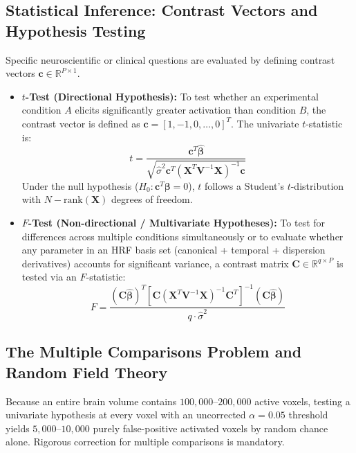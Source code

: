 \documentclass[11pt,a4paper]{article}
\begin{document}
\subsection{Statistical Inference: Contrast Vectors and Hypothesis Testing}
Specific neuroscientific or clinical questions are evaluated by defining contrast vectors $\mathbf{c} \in \mathbb{R}^{P \times 1}$. 
\begin{itemize}[leftmargin=2em]
    \item \textbf{$t$-Test (Directional Hypothesis):} To test whether an experimental condition $A$ elicits significantly greater activation than condition $B$, the contrast vector is defined as $\mathbf{c} = [1, -1, 0, \dots, 0]^T$. The univariate $t$-statistic is:
    \begin{equation}
        t = \frac{\mathbf{c}^T \hat{\boldsymbol{\beta}}}{\sqrt{\hat{\sigma}^2 \mathbf{c}^T \left( \mathbf{X}^T \mathbf{V}^{-1} \mathbf{X} \right)^{-1} \mathbf{c}}}
    \end{equation}
    Under the null hypothesis ($H_0: \mathbf{c}^T \boldsymbol{\beta} = 0$), $t$ follows a Student's $t$-distribution with $N - \text{rank}(\mathbf{X})$ degrees of freedom.
    \item \textbf{$F$-Test (Non-directional / Multivariate Hypotheses):} To test for differences across multiple conditions simultaneously or to evaluate whether any parameter in an HRF basis set (canonical + temporal + dispersion derivatives) accounts for significant variance, a contrast matrix $\mathbf{C} \in \mathbb{R}^{q \times P}$ is tested via an $F$-statistic:
    \begin{equation}
        F = \frac{(\mathbf{C} \hat{\boldsymbol{\beta}})^T \left[ \mathbf{C} \left( \mathbf{X}^T \mathbf{V}^{-1} \mathbf{X} \right)^{-1} \mathbf{C}^T \right]^{-1} (\mathbf{C} \hat{\boldsymbol{\beta}})}{q \cdot \hat{\sigma}^2}
    \end{equation}
\end{itemize}

\subsection{The Multiple Comparisons Problem and Random Field Theory}
Because an entire brain volume contains $100,000\text{--}200,000$ active voxels, testing a univariate hypothesis at every voxel with an uncorrected $\alpha = 0.05$ threshold yields $5,000\text{--}10,000$ purely false-positive activated voxels by random chance alone. Rigorous correction for multiple comparisons is mandatory.
\end{document}
